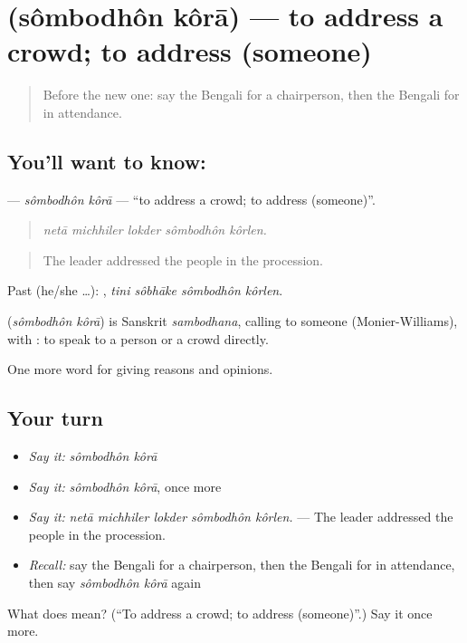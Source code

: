 \section[\texorpdfstring{\bn{সম্বোধন} \bn{করা} (sômbodhôn kôrā)}{সম্বোধন করা (sômbodhôn kôrā)}]{  (sômbodhôn kôrā) — to address a crowd; to address (someone)}

\label{lesson:BN-C360-sombodhon-kora}



\begin{quote}
Before the new one: say the Bengali for a chairperson, then the Bengali for in attendance.
\end{quote}

\subsection*{You'll want to know:  }
\textbf{ } — \emph{sômbodhôn kôrā} — \textquotedblleft{}to address a crowd; to address (someone)\textquotedblright{}.

\begin{quote}
    
\end{quote}

\begin{quote}
\emph{netā michhiler lokder sômbodhôn kôrlen.}
\end{quote}

\begin{quote}
The leader addressed the people in the procession.
\end{quote}

Past (he/she …):    , \emph{tini sôbhāke sômbodhôn kôrlen}.

\begin{cousinweb}
\textbf{ } (\emph{sômbodhôn kôrā}) is Sanskrit \emph{sambodhana}, calling to someone (Monier-Williams), with : to speak to a person or a crowd directly.
\end{cousinweb}

\begin{grammarlens}[title={What you've built}]
One more word for giving reasons and opinions.
\end{grammarlens}

\subsection*{Your turn}
\begin{itemize}
\raggedright
  \item \emph{Say it:} \emph{sômbodhôn kôrā}
  \item \emph{Say it:} \emph{sômbodhôn kôrā}, once more
  \item \emph{Say it:} \emph{netā michhiler lokder sômbodhôn kôrlen.} — The leader addressed the people in the procession.
  \item \emph{Recall:} say the Bengali for a chairperson, then the Bengali for in attendance, then say \emph{sômbodhôn kôrā} again
\end{itemize}

\begin{tcolorbox}[breakable,colback=teal!4,colframe=teal!35!black,title={Before you move on}]
What does   mean? (\textquotedblleft{}To address a crowd; to address (someone)\textquotedblright{}.) Say it once more.
\end{tcolorbox}
